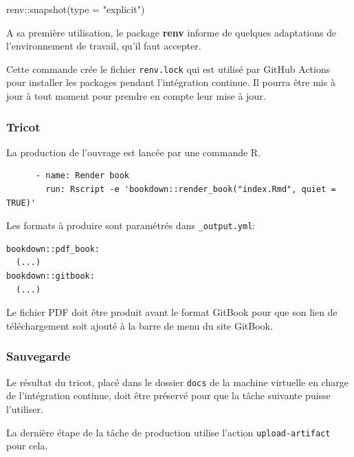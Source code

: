 \documentclass[
  11pt,
  french,
  a4paper,
  extrafontsizes,onecolumn,openright
  ]{memoir}
\newenvironment{Shaded}{\begin{snugshade}}{\end{snugshade}}
\newcommand{\AttributeTok}[1]{\textcolor[rgb]{0.77,0.63,0.00}{#1}}
\newcommand{\FunctionTok}[1]{\textcolor[rgb]{0.00,0.00,0.00}{#1}}
\newcommand{\NormalTok}[1]{#1}
\newcommand{\SpecialCharTok}[1]{\textcolor[rgb]{0.00,0.00,0.00}{#1}}
\newcommand{\StringTok}[1]{\textcolor[rgb]{0.31,0.60,0.02}{#1}}
\begin{document}
\scriptsize

\begin{Shaded}
\begin{Highlighting}[]
\NormalTok{renv}\SpecialCharTok{::}\FunctionTok{snapshot}\NormalTok{(}\AttributeTok{type =} \StringTok{"explicit"}\NormalTok{)}
\end{Highlighting}
\end{Shaded}

\normalsize

A sa première utilisation, le package \textbf{renv} informe de quelques adaptations de l'environnement de travail, qu'il faut accepter.

Cette commande crée le fichier \texttt{renv.lock} qui est utilisé par GitHub Actions pour installer les packages pendant l'intégration continue.
Il pourra être mis à jour à tout moment pour prendre en compte leur mise à jour.

\hypertarget{tricot}{%
\subsubsection{Tricot}\label{tricot}}

La production de l'ouvrage est lancée par une commande R.

\begin{verbatim}
      - name: Render book
        run: Rscript -e 'bookdown::render_book("index.Rmd", quiet = TRUE)'
\end{verbatim}

Les formats à produire sont paramétrés dans \texttt{\_output.yml}:

\begin{verbatim}
bookdown::pdf_book:
  (...)
bookdown::gitbook:
  (...)
\end{verbatim}

Le fichier PDF doit être produit avant le format GitBook pour que son lien de téléchargement soit ajouté à la barre de menu du site GitBook.

\hypertarget{sauvegarde}{%
\subsubsection{Sauvegarde}\label{sauvegarde}}

Le résultat du tricot, placé dans le dossier \texttt{docs} de la machine virtuelle en charge de l'intégration continue, doit être préservé pour que la tâche suivante puisse l'utiliser.

La dernière étape de la tâche de production utilise l'action \texttt{upload-artifact} pour cela.
\end{document}
